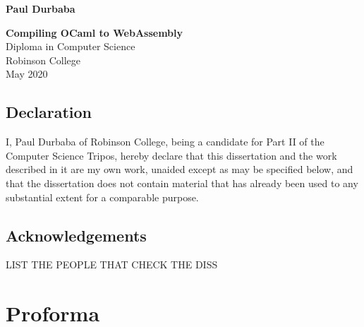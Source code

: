 \documentclass[12pt,twoside,notitlepage]{report}
\begin{document}


\pagestyle{empty}

\hfill{\LARGE \bf Paul Durbaba}

\vspace*{60mm}
\begin{center}
\Huge
{\bf Compiling OCaml to WebAssembly} \\
\vspace*{5mm}
Diploma in Computer Science \\
\vspace*{5mm}
Robinson College \\
\vspace*{5mm}
May 2020  %
\end{center}

\clearpage


 
\newpage
\section*{Declaration}

I, Paul Durbaba of Robinson College, being a candidate for Part II of the Computer
Science Tripos, hereby declare
that this dissertation and the work described in it are my own work,
unaided except as may be specified below, and that the dissertation
does not contain material that has already been used to any substantial
extent for a comparable purpose.

\bigskip
{}

\medskip
{}

\section*{Acknowledgements}

LIST THE PEOPLE THAT CHECK THE DISS


\setcounter{page}{1}
\pagestyle{plain}

\chapter*{Proforma}
\end{document}
